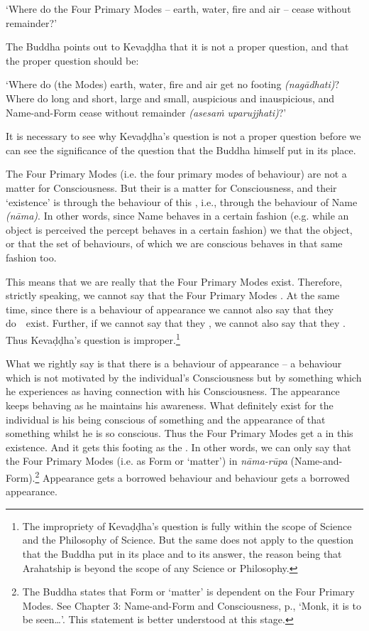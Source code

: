 `Where do the Four Primary Modes -- earth, water, fire and air -- cease without remainder?'

The Buddha points out to Kevaḍḍha that it is not a proper question, and that the proper question should be:

`Where do (the Modes) earth, water, fire and air get no footing \emph{(nagādhati)}? Where do long and short, large and small, auspicious and inauspicious, and Name-and-Form cease without remainder \emph{(asesaṁ uparujjhati)}?'

It is necessary to see why Kevaḍḍha's question is not a proper question before we can see the significance of the question that the Buddha himself put in its place.

\label{ch-13-the-four-primary}The Four Primary Modes (i.e. the four primary modes of behaviour)  are not a matter for Consciousness. But their  is a matter for Consciousness, and their `existence' is  through the behaviour of this , i.e., through the behaviour of Name \emph{(nāma)}. In other words, since Name behaves in a certain fashion (e.g. while an object is perceived the percept behaves in a certain fashion) we  that the object, or that the set of behaviours, of which we are conscious behaves in that same fashion too.

This means that we are really  that the Four Primary Modes exist. Therefore, strictly speaking, we cannot say that the Four Primary Modes . At the same time, since there is a behaviour of appearance we cannot also say that they do~~exist. Further, if we cannot say that they , we cannot also say that they . Thus Kevaḍḍha's question is improper.\footnote{The impropriety of Kevaḍḍha's question is fully within the scope of Science and the Philosophy of Science. But the same does not apply to the question that the Buddha put in its place and to its answer, the reason being that Arahatship is beyond the scope of any Science or Philosophy.}

What we  rightly say is that there is a behaviour of appearance -- a behaviour which is not motivated by the individual's Consciousness but by something which he experiences as having  connection with his Consciousness. The appearance keeps behaving as he maintains his awareness. What  definitely exist for the individual is his being conscious of something and the appearance of that something whilst he is so conscious. Thus the Four Primary Modes get a  in this existence. And it gets this footing as the . In other words, we can only say that the Four Primary Modes  (i.e. as Form or `matter') in \emph{nāma-rūpa} (Name-and-Form).\footnote{The Buddha states that Form or `matter' is dependent on the Four Primary Modes. See Chapter 3: Name-and-Form and Consciousness, p.\pageref{ch-03-dependent}, `Monk, it is to be seen\ldots{}'. This statement is better understood at this stage.} Appearance gets a borrowed behaviour and behaviour gets a borrowed appearance.

